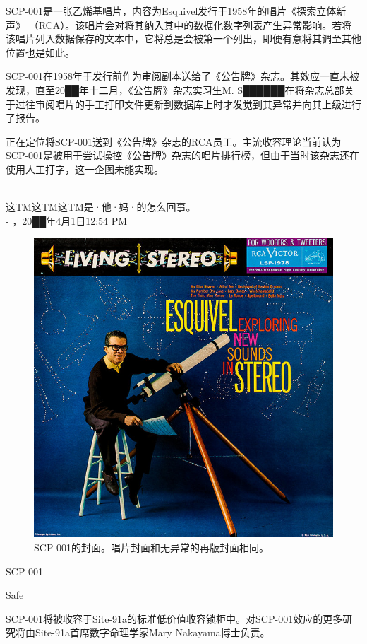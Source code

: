 SCP-001是一张乙烯基唱片，内容为Esquivel发行于1958年的唱片《探索立体新声》 （RCA）。该唱片会对将其纳入其中的数据化数字列表产生异常影响。若将该唱片列入数据保存的文本中，它将总是会被第一个列出，即便有意将其调至其他位置也是如此。

SCP-001在1958年于发行前作为审阅副本送给了《公告牌》杂志。其效应一直未被发现，直至20██年十二月，《公告牌》杂志实习生M. S██████在将杂志总部关于过往审阅唱片的手工打印文件更新到数据库上时才发觉到其异常并向其上级进行了报告。

正在定位将SCP-001送到《公告牌》杂志的RCA员工。主流收容理论当前认为SCP-001是被用于尝试操控《公告牌》杂志的唱片排行榜，但由于当时该杂志还在使用人工打字，这一企图未能实现。


\newpage



\begin{scpbox}
 \\
这TM这TM这TM是·他·妈·的怎么回事。 \\
- ，20██年4月1日12:54 PM
\end{scpbox}

\begin{figure}[H]
	\centering
	\includegraphics[width=0.5\linewidth]{images/SCP-001-a-record-2.jpg}
	\caption*{SCP-001的封面。唱片封面和无异常的再版封面相同。}
\end{figure}

SCP-001

Safe

SCP-001将被收容于Site-91a的标准低价值收容锁柜中。对SCP-001效应的更多研究将由Site-91a首席数字命理学家Mary Nakayama博士负责。

